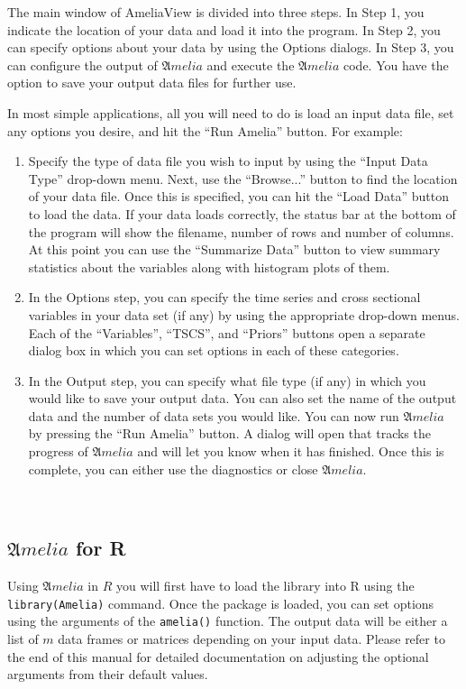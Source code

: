 \documentclass[12pt,titlepage]{article}
\newcommand{\Amelia}{\ensuremath{\mathfrak Amelia} }
\begin{document}
The main window of AmeliaView is divided into three steps.  In Step 1,
you indicate the location of your data and load it into the program.
In Step 2, you can specify options about your data by using the Options
dialogs.  In Step 3, you can configure the output of
${\mathfrak Amelia}$ and execute the ${\mathfrak Amelia}$ code.  You
have the option to save your output data files for further use.

In most simple applications, all you will need to do is load an input
data file, set any options you desire, and hit the ``Run Amelia''
button.  For example:
\begin{enumerate}
\item Specify the type of data file you wish to input by using the
  ``Input Data Type'' drop-down menu.  Next, use the ``Browse...''
  button to find the location of your data file.  Once this is
  specified, you can hit the ``Load Data'' button to load the data.
  If your data loads correctly, the status bar at the bottom of the
  program will show the filename, number of rows and number of
  columns.  At this point you can use the ``Summarize Data'' button to
  view summary statistics about the variables along with histogram
  plots of them.
\item In the Options step, you can specify the time series and cross
  sectional variables in your data set (if any) by using the
  appropriate drop-down menus.  Each of the ``Variables'', ``TSCS'',
  and ``Priors'' buttons open a separate dialog box in which you can
  set options in each of these categories.
\item In the Output step, you can specify what file type (if any) in
  which you would like to save your output data.  You can also set the
  name of the output data and the number of data sets you would like.
  You can now run ${\mathfrak Amelia}$ by pressing the ``Run Amelia''
  button.  A dialog will open that tracks the progress of ${\mathfrak
    Amelia}$ and will let you know when it has finished.  Once this is
  complete, you can either use the diagnostics or close ${\mathfrak
    Amelia}$.
\end{enumerate}

\ 
\subsection{\Amelia for R}

\label{sec:roverview}
Using \Amelia in $R$ you will first have to load the library into R
using the \texttt{library(Amelia)} command.  Once the package is
loaded, you can set options using the arguments of the
\texttt{amelia()} function.  The output data will be either a list of
$m$ data frames or matrices depending on your input data.  Please
refer to the end of this manual for detailed documentation on
adjusting the optional arguments from their default values.
\end{document}
